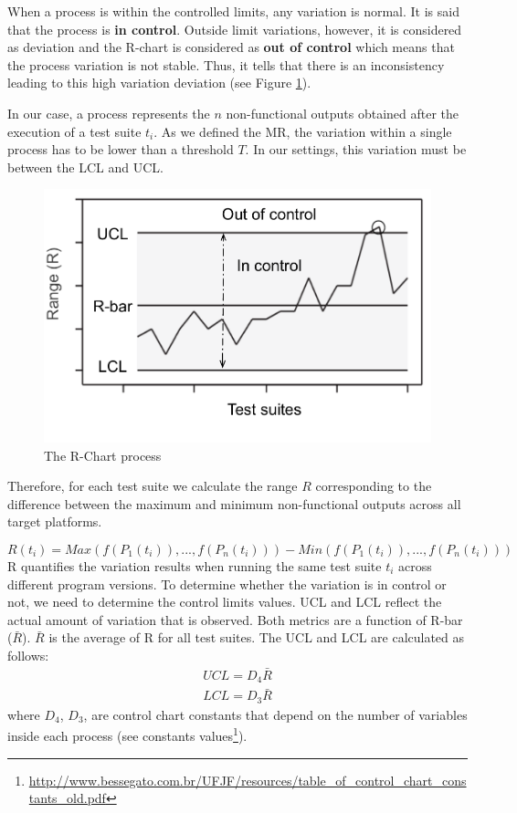 When a process is within the controlled limits, any variation is normal. It is said that the process is \textbf{in control}. 
Outside limit variations, however, it is considered as deviation and the R-chart is considered as \textbf{out of control} which means that the process variation is not stable. Thus, it tells that there is an inconsistency leading to this high variation deviation (see Figure \ref{fig:cg-rechart}).

In our case, a process represents the $n$ non-functional outputs obtained after the execution of a test suite $t_{i}$. As we defined the MR, the variation within a single process has to be lower than a threshold $T$. In our settings, this variation must be between the LCL and UCL.

\begin{figure}[h]
	\centering
	\includegraphics[width=0.6\linewidth]{chapitre4/fig/rchat}
	\caption{The R-Chart process}
	\label{fig:cg-rechart}
\end{figure}

Therefore, for each test suite we calculate the range $R$ corresponding to the difference between the maximum and minimum non-functional outputs across all target platforms.

\begin{equation}
R(t_{i})= Max(f(P_{1}(t_{i})),..., f(P_{n}(t_{i}))) - Min(f(P_{1}(t_{i})),..., f(P_{n}(t_{i})))  
\end{equation}
R quantifies the variation results when running the same test suite $t_{i}$ across different program versions.
To determine whether the variation is in control or not, we need to determine the control limits values. UCL and LCL reflect the actual amount of variation that is observed. Both metrics are a function of R-bar ($\bar{R}$). $\bar{R}$ is the average of R for all test suites.
The UCL and LCL are calculated as follows:
\begin{equation}
\begin{split} 
UCL = D_{4}\bar{R}\\
LCL = D_{3}\bar{R}
\end{split} 
\label{eqUCL}
\end{equation}
where $D_{4}$, $D_{3}$, are control chart constants that depend on the number of variables inside each process (see constants values\footnote{\url{http://www.bessegato.com.br/UFJF/resources/table_of_control_chart_constants_old.pdf}}). 

